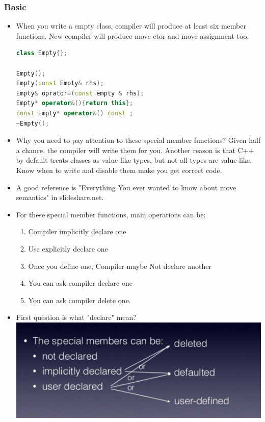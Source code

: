 \documentclass[a4paper,12pt,twoside]{book}
\begin{document}
\subsubsection{Basic}

\begin{itemize}

\item When you write a empty class, compiler will produce at least six member functions.  New compiler will produce move ctor and move assignment too.
\begin{lstlisting}[frame=single, language=c++]
class Empty{};

Empty();
Empty(const Empty& rhs);
Empty& oprator=(const empty & rhs);
Empty* operator&(){return this};
const Empty* operator&() const ;
~Empty();
\end{lstlisting}

\item Why you need to pay attention to these special member functions?  Given half a chance, the compiler will write them for you. Another reason is that C++ by default treats classes as value-like types, but not all types are value-like. Know when to write and disable them make you get correct code.

\item A good reference is "Everything You ever wanted to know about move semantics" in slideshare.net.

\item For these special member functions, main operations can be:
\begin{enumerate}
\item Compiler implicitly declare one
\item Use explicitly declare one
\item Once you define one, Compiler maybe Not declare another
\item You can ask compiler declare one
\item You can ask compiler delete one.
\end{enumerate}

\item First question is what "declare" mean?  \\
\includegraphics[scale=0.6]{pics/sm1.png} \newline


\end{itemize}
\end{document}
